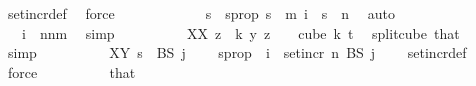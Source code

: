 \begin{isabellebody}
\ set{\isacharunderscore}{\kern0pt}incr{\isacharunderscore}{\kern0pt}def\ \isamarkupfalse%
\ force\ \isanewline
\ \ \ \ \ \ \ \ \isamarkupfalse%
\ \isamarkupfalse%
\ s\ \ s{\isacharunderscore}{\kern0pt}prop{\isacharcolon}{\kern0pt}\ {\isachardoublequoteopen}s\ {\isacharless}{\kern0pt}\ m{\isachardoublequoteclose}\ {\isachardoublequoteopen}i\ {\isacharequal}{\kern0pt}\ s\ {\isacharplus}{\kern0pt}\ n{\isachardoublequoteclose}\ \isamarkupfalse%
\ auto\isanewline
\ \ \ \ \ \ \ \ \isamarkupfalse%
\ \isamarkupfalse%
\ {\isacharasterisk}{\kern0pt}{\isacharcolon}{\kern0pt}\ {\isachardoublequoteopen}\ i\ {\isasymin}\ {\isacharbraceleft}{\kern0pt}n{\isachardot}{\kern0pt}{\isachardot}{\kern0pt}{\isacharless}{\kern0pt}n{\isacharplus}{\kern0pt}m{\isacharbraceright}{\kern0pt}{\isachardoublequoteclose}\ \isamarkupfalse%
\ simp\isanewline
\isanewline
\ \ \ \ \ \ \ \ \isamarkupfalse%
\ XX{\isacharcolon}{\kern0pt}\ {\isachardoublequoteopen}{\isacharparenleft}{\kern0pt}{\isasymlambda}z\ {\isasymin}\ {\isacharbraceleft}{\kern0pt}{\isachardot}{\kern0pt}{\isachardot}{\kern0pt}{\isacharless}{\kern0pt}k{\isacharbraceright}{\kern0pt}{\isachardot}{\kern0pt}\ y\ {\isacharparenleft}{\kern0pt}z\ {\isacharplus}{\kern0pt}\ {}{\isacharparenright}{\kern0pt}{\isacharparenright}{\kern0pt}\ {\isasymin}\ cube\ k\ {\isacharparenleft}{\kern0pt}t{\isacharplus}{\kern0pt}{}{\isacharparenright}{\kern0pt}{\isachardoublequoteclose}\ \isamarkupfalse%
\ split{\isacharunderscore}{\kern0pt}cube\ that\ \isamarkupfalse%
\ simp\isanewline
\ \ \ \ \ \ \ \ \isamarkupfalse%
\ XY{\isacharcolon}{\kern0pt}\ {\isachardoublequoteopen}s\ {\isasymin}\ BS\ {\isacharparenleft}{\kern0pt}j\ {\isacharminus}{\kern0pt}\ {}{\isacharparenright}{\kern0pt}{\isachardoublequoteclose}\ \isamarkupfalse%
\ s{\isacharunderscore}{\kern0pt}prop\ {}\ {\isacartoucheopen}i\ {\isasymin}\ set{\isacharunderscore}{\kern0pt}incr\ n\ {\isacharparenleft}{\kern0pt}BS\ {\isacharparenleft}{\kern0pt}j\ {\isacharminus}{\kern0pt}\ {}{\isacharparenright}{\kern0pt}{\isacharparenright}{\kern0pt}{\isacartoucheclose}\ \isamarkupfalse%
\ set{\isacharunderscore}{\kern0pt}incr{\isacharunderscore}{\kern0pt}def\ \isamarkupfalse%
\ force\isanewline
\isanewline
\ \ \ \ \ \ \ \ \isamarkupfalse%
\ that\ \isamarkupfalse%

\end{isabellebody}
